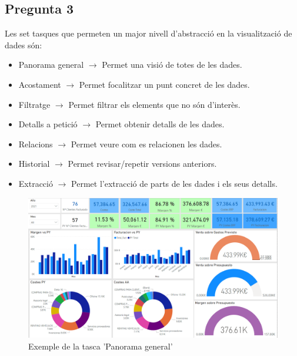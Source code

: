 \documentclass[a4paper,12pt]{report}
\begin{document}
\subsection*{Pregunta 3}
Les set tasques que permeten un major nivell d'abstracció en la visualització de dades són:
\begin{itemize}
    \item Panorama general $\rightarrow$ Permet una visió de totes de les dades.
    \item Acostament $\rightarrow$ Permet focalitzar un punt concret de les dades.
    \item Filtratge $\rightarrow$ Permet filtrar els elements que no són d'interès.
    \item Detalls a petició $\rightarrow$ Permet obtenir detalls de les dades.
    \item Relacions $\rightarrow$ Permet veure com es relacionen les dades.
    \item Historial $\rightarrow$ Permet revisar/repetir versions anteriors.
    \item Extracció $\rightarrow$ Permet l'extracció de parts de les dades i els seus detalls.
\end{itemize}
\begin{figure}[H]
    \centering
    \includegraphics[scale = 0.2]{images/dashboard_ventas.png}
    \caption{Exemple de la tasca 'Panorama general'}
    \label{fig:panorama_general}
\end{figure}
\end{document}
